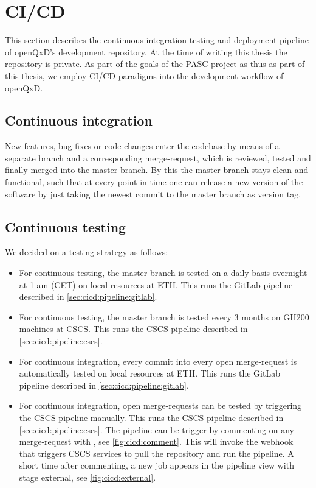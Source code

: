 
\chapter{CI/CD}
\label{ch:p1:cicd}

This section describes the continuous integration testing and deployment pipeline of openQxD's development repository\cite{gitlab:openqxd-devel}. At the time of writing this thesis the repository is private. As part of the goals of the PASC project\cite{pasc:project} as thus as part of this thesis, we employ CI/CD paradigms into the development workflow of openQxD.

\section{Continuous integration}

New features, bug-fixes or code changes enter the codebase by means of a separate branch and a corresponding merge-request, which is reviewed, tested and finally merged into the master branch. By this the master branch stays clean and functional, such that at every point in time one can release a new version of the software by just taking the newest commit to the master branch as version tag.

\section{Continuous testing}
\label{sec:cicd:testing}

We decided on a testing strategy as follows:

\begin{itemize}
    \item For continuous testing, the master branch is tested on a daily basis overnight at 1 am (CET) on local resources at ETH. This runs the GitLab pipeline described in \cref{sec:cicd:pipeline:gitlab}.
    \item For continuous testing, the master branch is tested every 3 months on GH200 machines at CSCS. This runs the CSCS pipeline described in \cref{sec:cicd:pipeline:cscs}.
    \item For continuous integration, every commit into every open merge-request is automatically tested on local resources at ETH. This runs the GitLab pipeline described in \cref{sec:cicd:pipeline:gitlab}.
    \item{For continuous integration, open merge-requests can be tested by triggering the CSCS pipeline manually. This runs the CSCS pipeline described in \cref{sec:cicd:pipeline:cscs}. The pipeline can be trigger by commenting on any merge-request with , see \cref{fig:cicd:comment}. This will invoke the webhook that triggers CSCS services to pull the repository and run the pipeline. A short time after commenting, a new job appears in the pipeline view with stage external, see \cref{fig:cicd:external}.}
\end{itemize}


